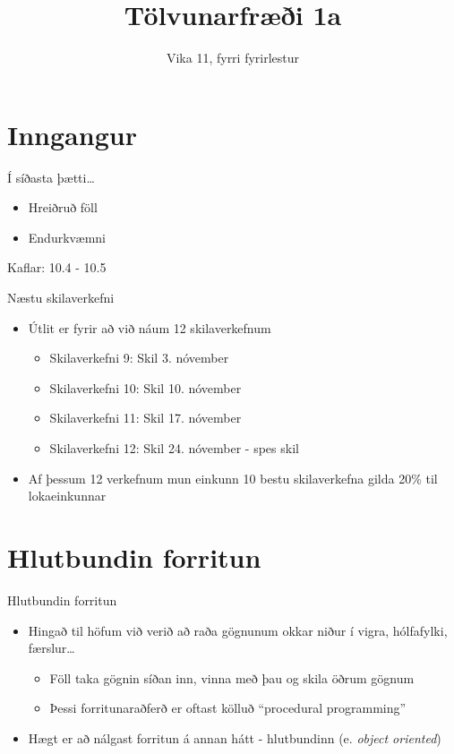 \documentclass{beamer}
\title{Tölvunarfræði 1a}
\subtitle{Vika 11, fyrri fyrirlestur}
\begin{document}
\begin{frame}
\titlepage
\end{frame}

\section{Inngangur}

\begin{frame}{Í síðasta þætti\ldots}
\begin{itemize}
 \item Hreiðruð föll
 \item Endurkvæmni
\end{itemize}
Kaflar: 10.4 - 10.5
\end{frame}

\begin{frame}{Næstu skilaverkefni}
\begin{itemize}
 \item Útlit er fyrir að við náum 12 skilaverkefnum
 \begin{itemize}
  \item Skilaverkefni 9: Skil 3. nóvember
  \item Skilaverkefni 10: Skil 10. nóvember 
  \item Skilaverkefni 11: Skil 17. nóvember
  \item Skilaverkefni 12: Skil 24. nóvember - spes skil
 \end{itemize}
 \item Af þessum 12 verkefnum mun einkunn 10 bestu skilaverkefna gilda 20\% til lokaeinkunnar
\end{itemize}
\end{frame}

\section{Hlutbundin forritun}

\begin{frame}{Hlutbundin forritun}
\begin{itemize}
 \item Hingað til höfum við verið að raða gögnunum okkar niður í vigra, hólfafylki, færslur\ldots
 \begin{itemize}
  \item Föll taka gögnin síðan inn, vinna með þau og skila öðrum gögnum
  \item Þessi forritunaraðferð er oftast kölluð ``procedural programming''
 \end{itemize}
 \item Hægt er að nálgast forritun á annan hátt - hlutbundinn (e. \emph{object oriented})
\end{itemize}
\end{frame}
\end{document}
